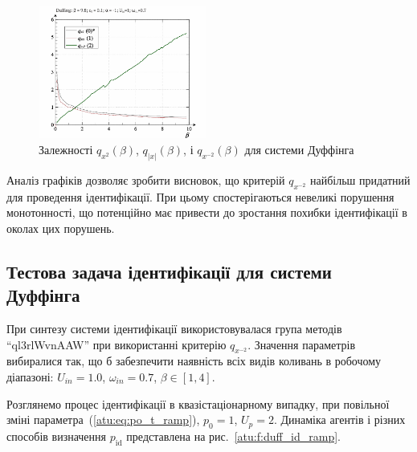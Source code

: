 \begin{figure}[ht!]
\begin{center}
  \includegraphics[width=0.49\textwidth]{p/cha/duff/duff_q-p_q_1x00_0x70.png}
\end{center}
\caption{Залежності $ q_{x^2}(\beta)$, $ q_{|x|}(\beta)$, і $q_{x^{-2}}(\beta)$ для системи Дуффінга}
\label{atu:f:duff_q}
\end{figure}

Аналіз графіків дозволяє зробити висновок, що критерій
$q_{x^{-2}}$ найбільш придатний для проведення ідентифікації. При
цьому спостерігаються невеликі порушення монотонності, що
потенційно має привести до зростання похибки ідентифікації в
околах цих порушень.




\subsection{Тестова задача ідентифікації для системи Дуффінга} %

При синтезу системи ідентифікації використовувалася група
методів ``ql3rlWvnAAW'' при використанні критерію
$q_{x^{-2}}$. Значення параметрів вибиралися так, що б забезпечити
наявність всіх видів коливань в робочому діапазоні:
$U_{in} = 1.0 $,
$\omega_{in} = 0.7 $,
$\beta \in [1, 4] $.

Розглянемо процес ідентифікації в квазістаціонарному випадку,
при повільної зміні параметра~(\ref{atu:eq:po_t_ramp}),
$ p_0 = 1 $,
$ U_p = 2 $. Динаміка агентів і різних способів визначення
$ p_\mathrm{id} $ представлена на рис.~\ref{atu:f:duff_id_ramp}.

